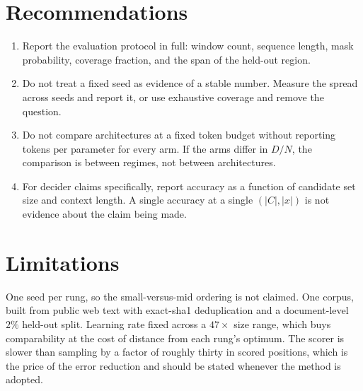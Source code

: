 \documentclass[11pt]{article}
\begin{document}
\section{Recommendations}

\begin{enumerate}
  \item Report the evaluation protocol in full: window count, sequence length, mask
  probability, coverage fraction, and the span of the held-out region.
  \item Do not treat a fixed seed as evidence of a stable number. Measure the
  spread across seeds and report it, or use exhaustive coverage and remove the
  question.
  \item Do not compare architectures at a fixed token budget without reporting
  tokens per parameter for every arm. If the arms differ in $D/N$, the comparison
  is between regimes, not between architectures.
  \item For decider claims specifically, report accuracy as a function of candidate
  set size and context length. A single accuracy at a single $(|C|, |x|)$ is not
  evidence about the claim being made.
\end{enumerate}

\section{Limitations}

One seed per rung, so the small-versus-mid ordering is not claimed. One corpus,
built from public web text \citep{penedo2024fineweb} with exact-sha1 deduplication and a document-level $2\%$
held-out split. Learning rate fixed across a $47\times$ size range, which buys
comparability at the cost of distance from each rung's optimum. The scorer is
slower than sampling by a factor of roughly thirty in scored positions, which is
the price of the error reduction and should be stated whenever the method is
adopted.



\end{document}
